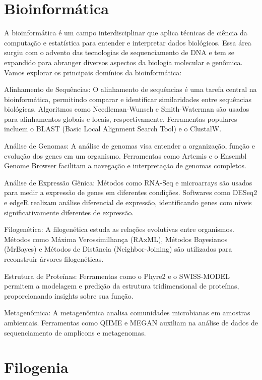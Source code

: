 \section{Bioinformática}
A bioinformática é um campo interdisciplinar que aplica técnicas de ciência da computação e estatística para entender e interpretar dados biológicos. Essa área surgiu com o advento das tecnologias de sequenciamento de DNA e tem se expandido para abranger diversos aspectos da biologia molecular e genômica. Vamos explorar os principais domínios da bioinformática:

Alinhamento de Sequências:
O alinhamento de sequências é uma tarefa central na bioinformática, permitindo comparar e identificar similaridades entre sequências biológicas. Algoritmos como Needleman-Wunsch e Smith-Waterman são usados para alinhamentos globais e locais, respectivamente. Ferramentas populares incluem o BLAST (Basic Local Alignment Search Tool) e o ClustalW.

Análise de Genomas:
A análise de genomas visa entender a organização, função e evolução dos genes em um organismo. Ferramentas como Artemis e o Ensembl Genome Browser facilitam a navegação e interpretação de genomas completos.

Análise de Expressão Gênica:
Métodos como RNA-Seq e microarrays são usados para medir a expressão de genes em diferentes condições. Softwares como DESeq2 e edgeR realizam análise diferencial de expressão, identificando genes com níveis significativamente diferentes de expressão.

Filogenética:
A filogenética estuda as relações evolutivas entre organismos. Métodos como Máxima Verossimilhança (RAxML), Métodos Bayesianos (MrBayes) e Métodos de Distância (Neighbor-Joining) são utilizados para reconstruir árvores filogenéticas.

Estrutura de Proteínas:
Ferramentas como o Phyre2 e o SWISS-MODEL permitem a modelagem e predição da estrutura tridimensional de proteínas, proporcionando insights sobre sua função.

Metagenômica:
A metagenômica analisa comunidades microbianas em amostras ambientais. Ferramentas como QIIME e MEGAN auxiliam na análise de dados de sequenciamento de amplicons e metagenomas.
\section{Filogenia}

